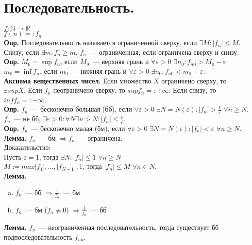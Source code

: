 \documentclass{article}
\begin{document}
	\tableofcontents
	\setcounter{tocdepth}{3}
	\newpage
	\section{Последовательность.}
	$f: \mathbb{N} \rightarrow \mathbb{R}$ \\
	$f(n) =: f_n$ \\
	\textbf{Опр.} Последовательность называется ограниченной сверху, если $\exists M: |f_n| \leqslant M$. Снизу, если $\exists m:  f_n \geqslant m$. $f_n$~--- ограниченная, если ограничена сверху и снизу. \\
	\textbf{Опр.} $M_0 = \sup f_n$, если $M_0$~--- верхняя грань и $\forall \varepsilon > 0$ $\exists n_0: f_{n0} > M_0 - \varepsilon$. $m_0 = \inf f_n$, если $m_0$~--- нижняя грань и $\forall \varepsilon > 0$ $\exists n_0: f_{n0} < m_0 + \varepsilon$. \\
	\textbf{Аксиома вещественных чисел.} Если множество $X$ ограничено сверху, то $\exists sup X$. Если $f_n$ неограничено сверху, то $sup f_n =: + \infty$. Если снизу, то $inf f_n =: - \infty$. \\
	\textbf{Опр.} $f_n$~--- бесконечно большая (бб), если $\forall \varepsilon > 0$ $\exists N = N(\varepsilon): |f_n| > \frac{1}{\varepsilon}$ $\forall n \geqslant N$. $f_n$~--- не бб, $\exists \varepsilon > 0: \forall N \exists n > N: |f_n| \leqslant \frac{1}{\varepsilon}$. \\
	\textbf{Опр.} $f_n$~--- бесконечно малая (бм), если $\forall \varepsilon > 0$ $\exists N = N(\varepsilon): |f_n| <\varepsilon$ $\forall n \geqslant N$. \\
	\textbf{Лемма.} $f_n$~--- бм $\Rightarrow f_n$~--- ограничена. \\
	Доказательство: \\
	Пусть $\varepsilon = 1$, тогда $\exists N: |f_n| \leqslant 1$ $\forall n \geqslant N$ \\
	$M := max{|f_1|, \dots, |f_{N - 1}|, 1}$, тогда $|f_n| \leqslant M$ $\forall n \in N$. \\
	\textbf{Лемма.} \\
	\begin{enumerate}[a)]
		\item $f_n$~--- бб $\Rightarrow \frac{1}{f_n}$~--- бм
		\item $f_n$~--- бм ($f_n \not= 0$) $\Rightarrow \frac{1}{f_n}$~--- бб
	\end{enumerate}
	\textbf{Лемма.} $f_n$~--- неограниченная последовательность, тогда существует бб подпоследовательность $f_{nk}$. \\
\end{document}

